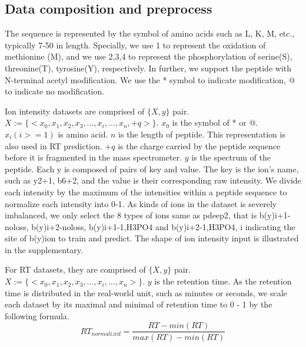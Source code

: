 
\subsection{Data composition and preprocess}
The sequence is represented by the symbol of amino acids such as L, K, M, etc., typically 7-50 in length. Specially, we use 1 to represent the oxidation of methionine (M), and we use 2,3,4 to represent the phosphorylation of serine(S), threonine(T), tyrosine(Y), respectively. In further, we support the peptide with N-terminal acetyl modification. We use the * symbol to indicate modification, @ to indicate no modification. 

Ion intensity datasets are comprised of $\{X, y\}$ pair. 
$X := \{ <x_0, x_1, x_2, x_3,\dots, x_i, \dots, x_n, +q> \}$. $x_0$ is the symbol of * or @. 
$x_i (i>= 1)$ is amino acid. $n$ is the length of peptide. This representation is also used in RT prediction. $+q$ is the charge carried by the peptide sequence before it is fragmented in the mass spectrometer. \( y \) is the spectrum of the peptide. Each y is composed of pairs of key and value.
The key is the ion's name, such as y2+1, b6+2, and the value is their corresponding raw intensity.
We divide each intensity by the maximum of the intensities within a peptide sequence to normalize each intensity into 0-1. As kinds of ions in the dataset is severely imbalanced, we only select the 8 types of ions same as pdeep2, that is b(y)i+1-noloss, b(y)i+2-noloss, b(y)i+1-1,H3PO4 and b(y)i+2-1,H3PO4, i indicating the site of b(y)ion to train and predict. The shape of ion intensity input is illustrated in the supplementary.

For RT datasets, they are comprised of \( \{X, y\} \) pair. 
$X:= \{ <x_0, x_1, x_2, x_3,\dots, x_i, \dots, x_n>\}$. \( y \) is the retention time. 
As the retention time is distributed in the real-world unit, such as minutes or seconds, we scale each dataset by its maximal and minimal of retention time to 0 - 1 by the following formula. 
\[RT_{normalized} = \frac{RT-min(RT)}{max(RT)-min(RT)}\]






